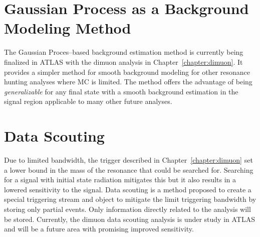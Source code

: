 \section{Gaussian Process as a Background Modeling Method}
The Gaussian Proces--based background estimation method is currently being finalized in ATLAS with the dimuon analysis in Chapter~\ref{chapter:dimuon}. It provides a simpler method for smooth background modeling for other resonance hunting analyses where MC is limited. The method offers the advantage of being \textit{generalizable} for any final state with a smooth background estimation in the signal region applicable to many other future analyses. 

\section{Data Scouting}
Due to limited bandwidth, the trigger described in Chapter~\ref{chapter:dimuon} set a lower bound in the mass of the resonance that could be searched for. Searching for a signal with initial state radiation mitigates this but it also results in a lowered sensitivity to the signal. Data scouting is a method proposed to create a special triggering stream and object to mitigate the limit triggering bandwidth by storing only partial events. Only information directly related to the analysis will be
stored. Currently, the dimuon data scouting analysis is under study in ATLAS and will be a future area with promising improved sensitivity. 

